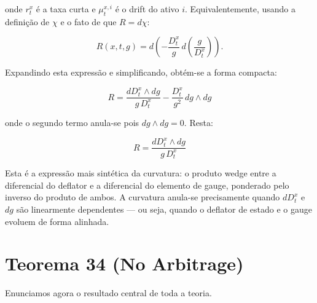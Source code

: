 \noindent onde $r_t^x$ \'e a taxa curta e $\mu_t^{x,i}$ \'e o drift do ativo $i$. Equivalentemente, usando a defini\c{c}\~ao de $\chi$ e o fato de que $R = d\chi$:

\begin{equation}
R(x, t, g) = d\left(-\frac{D_t^x}{g}\,d\left(\frac{g}{D_t^x}\right)\right).
\end{equation}

\noindent Expandindo esta express\~ao e simplificando, obt\'em-se a forma compacta:

\begin{equation}
\boxed{R = \frac{dD_t^x \wedge dg}{g\,D_t^x} - \frac{D_t^x}{g^2}\,dg \wedge dg}
\end{equation}

\noindent onde o segundo termo anula-se pois $dg \wedge dg = 0$. Resta:

\begin{equation}
\boxed{R = \frac{dD_t^x \wedge dg}{g\,D_t^x}}
\end{equation}

\noindent Esta \'e a express\~ao mais sint\'etica da curvatura: o produto wedge entre a diferencial do deflator e a diferencial do elemento de gauge, ponderado pelo inverso do produto de ambos. A curvatura anula-se precisamente quando $dD_t^x$ e $dg$ s\~ao linearmente dependentes --- ou seja, quando o deflator de estado e o gauge evoluem de forma alinhada.

\section{Teorema 34 (No Arbitrage)}

Enunciamos agora o resultado central de toda a teoria.


